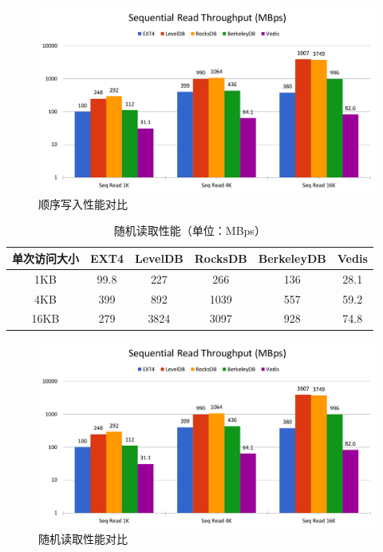 \documentclass{ctexart}
\begin{document}
\begin{figure}[htbp]
\centering
\caption{顺序写入性能对比}
\label{fig:seq-write}
\includegraphics[page=2,width=\textwidth]{HERMES_perf_plot.pdf}
\end{figure}


\begin{table}[htbp]
\centering
\caption{随机读取性能（单位：MBps）}
\label{tab:rand-read}
\begin{tabular}{cccccc}
\hline
单次访问大小 & EXT4 & LevelDB & RocksDB & BerkeleyDB & Vedis \\ \hline
1KB     & 99.8 & 227     & 266     & 136        & 28.1  \\
4KB     & 399  & 892     & 1039    & 557        & 59.2  \\
16KB    & 279  & 3824    & 3097    & 928        & 74.8  \\ \hline
\end{tabular}
\end{table}

\begin{figure}[htbp]
\centering
\caption{随机读取性能对比}
\label{fig:rand-read}
\includegraphics[page=3,width=\textwidth]{HERMES_perf_plot.pdf}
\end{figure}
\end{document}
